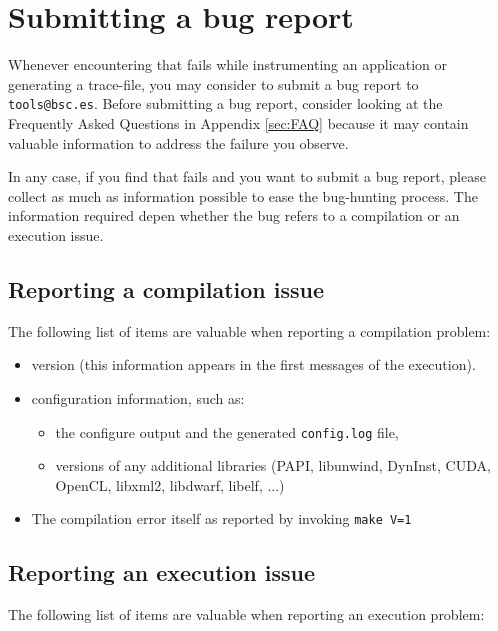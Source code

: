 \chapter{Submitting a bug report}\label{sec:submitbug}

Whenever encountering that \TRACE fails while instrumenting an application or generating a trace-file, you may consider to submit a bug report to \texttt{tools@bsc.es}.
Before submitting a bug report, consider looking at the Frequently Asked Questions in Appendix \ref{sec:FAQ} because it may contain valuable information to address the failure you observe.

In any case, if you find that \TRACE fails and you want to submit a bug report, please collect as much as information possible to ease the bug-hunting process.
The information required depen whether the bug refers to a compilation or an execution issue.

\section{Reporting a compilation issue}

The following list of items are valuable when reporting a compilation problem:

\begin{itemize}
\item \TRACE version (this information appears in the first messages of the execution).
\item \TRACE configuration information, such as:
\begin{itemize}
  \item the configure output and the generated \texttt{config.log} file,
  \item versions of any additional libraries (PAPI, libunwind, DynInst, CUDA, OpenCL, libxml2, libdwarf, libelf, ...)
\end{itemize}
\item The compilation error itself as reported by invoking \texttt{make V=1}
\end{itemize}

\section{Reporting an execution issue}

The following list of items are valuable when reporting an execution problem:

